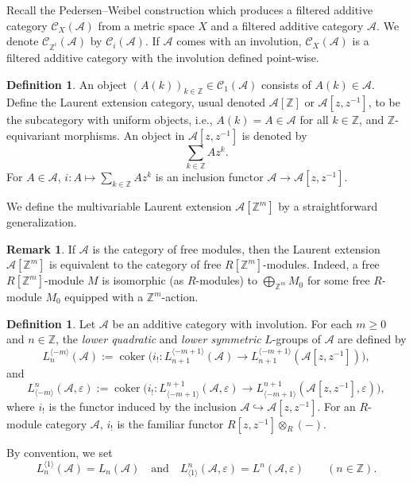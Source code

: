 \documentclass{article}
\theoremstyle{definition}
\newtheorem{defn}[theorem]{Definition}
\newtheorem{rmk}[theorem]{Remark}
\newcommand{\CA}{{ \mathcal A}}
\newcommand{\ZZ}{{\mathbb Z}}
\newcommand{\A}{\mathcal A}
\begin{document}
Recall the Pedersen--Weibel construction which produces a filtered additive category $\mathcal C_X(\CA)$ from a metric space $X$ and a filtered additive category $\CA$. We denote $\mathcal C_{\ZZ^i}(\CA)$ by $\mathcal C_i(\CA)$. If $\CA$ comes with an involution, $\mathcal C_X(\CA)$ is a filtered additive category with the involution defined point-wise. 
\begin{defn}
    An object $(A(k))_{k\in \ZZ}\in \mathcal C_1(\CA)$ consists of $A(k)\in \CA.$ Define the Laurent extension category, usual denoted $\CA[\ZZ]$ or $\CA[z, z^{-1}]$, to be the subcategory with uniform objects, i.e., $A(k)=A\in \CA$ for all $k\in \ZZ$, and $\ZZ$-equivariant morphisms.  An object in $\CA[z, z^{-1}]$ is denoted by 
    $$\sum_{k\in \ZZ}Az^k.$$ For $A\in \CA$, $i: A \mapsto \sum_{k\in \ZZ}Az^k$ is an inclusion functor $\CA\rightarrow \CA[z, z^{-1}].$
\end{defn}
We define the multivariable Laurent extension $\mathcal{A}[\mathbb{Z}^m]$ by a straightforward generalization.
\begin{rmk}
   If \( \mathcal{A} \) is the category of free modules, then the Laurent extension \( \mathcal{A}[\mathbb{Z}^m] \) is equivalent to the category of free \( R[\mathbb{Z}^m] \)-modules. Indeed, a free $R[\mathbb{Z}^m]$-module $M$ is isomorphic (as $R$-modules) to 
   $\bigoplus_{\mathbb{Z}^m}M_0$ for some free $R$-module $M_0$ equipped with a $\mathbb{Z}^m$-action. 

\end{rmk}

\begin{defn}
    Let \( \mathcal{A} \) be an additive category with involution. For each \( m \geq 0 \) and \( n \in \mathbb{Z} \), the \emph{lower quadratic} and \emph{lower symmetric} \( L \)-groups of \( \mathcal{A} \) are defined by
    \[
    L_n^{\langle -m \rangle}(\mathcal{A}) := \operatorname{coker}\big(i_! : L_{n+1}^{\langle -m+1 \rangle}(\mathcal{A}) \longrightarrow L_{n+1}^{\langle -m+1 \rangle}(\mathcal{A}[z, z^{-1}])\big),
    \]
    and
    \[
    L^n_{\langle -m \rangle}(\mathcal{A}, \varepsilon) := \operatorname{coker}\big(i_! : L^{n+1}_{\langle -m+1 \rangle}(\mathcal{A}, \varepsilon) \longrightarrow L^{n+1}_{\langle -m+1 \rangle}(\mathcal{A}[z, z^{-1}], \varepsilon)\big),
    \]
    where \( i_! \) is the functor induced by the inclusion \( \mathcal{A} \hookrightarrow \mathcal{A}[z, z^{-1}] \). For an $R$-module category $\A$, $i_!$ is the familiar functor $R[z, z^{-1}]\otimes_R(-)$.

    By convention, we set
    \[
    L_n^{\langle 1 \rangle}(\mathcal{A}) = L_n(\mathcal{A}) \quad \text{and} \quad L^n_{\langle 1 \rangle}(\mathcal{A}, \varepsilon) = L^n(\mathcal{A}, \varepsilon) \qquad (n \in \mathbb{Z}).
    \]
\end{defn}
\end{document}
